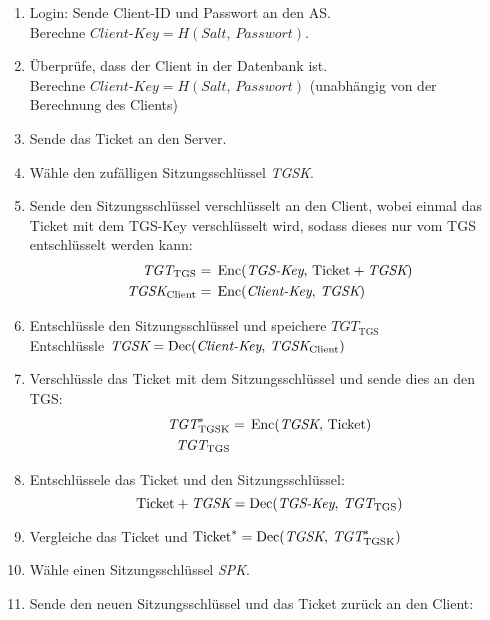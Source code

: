 				\begin{enumerate}
					\item Login: Sende Client-ID und Passwort an den AS. \\ Berechne \( \textit{Client-Key} = H(\textit{Salt},\, \textit{Passwort}) \).
					\item Überprüfe, dass der Client in der Datenbank ist. \\ Berechne \( \textit{Client-Key} = H(\textit{Salt},\, \textit{Passwort}) \) (unabhängig von der Berechnung des Clients)
					\item Sende das Ticket an den Server.
					\item Wähle den zufälligen Sitzungsschlüssel \textit{TGSK}.
					\item Sende den Sitzungsschlüssel verschlüsselt an den Client, wobei einmal das Ticket mit dem TGS-Key verschlüsselt wird, sodass dieses nur vom TGS entschlüsselt werden kann:
						\begin{align*}
							\textit{TGT}_\textrm{TGS}     & =\, \operatorname{Enc}(\textit{TGS-Key},\, \textrm{Ticket}+\textit{TGSK}) \\
							\textit{TGSK}_\textrm{Client} & =\, \operatorname{Enc}(\textit{Client-Key},\, \textit{TGSK})
						\end{align*}
					\item Entschlüssle den Sitzungsschlüssel und speichere \( \textit{TGT}_\textrm{TGS} \) \\ Entschlüssle \( \textit{TGSK} = \operatorname{Dec}(\textit{Client-Key},\, \textit{TGSK}_\textrm{Client}) \)
					\item Verschlüssle das Ticket mit dem Sitzungsschlüssel und sende dies an den TGS:
						\begin{align*}
							\textit{TGT}^*_\textrm{TGSK} & =\, \operatorname{Enc}(\textit{TGSK},\, \textrm{Ticket}) \\
							\textit{TGT}_\textrm{TGS}    &
						\end{align*}
					\item Entschlüssele das Ticket und den Sitzungsschlüssel:
						\begin{equation*}
							\textrm{Ticket}+\textit{TGSK} = \operatorname{Dec}(\textit{TGS-Key},\, \textit{TGT}_\textrm{TGS})
						\end{equation*}
					\item Vergleiche das Ticket und \( \textrm{Ticket}^* = \operatorname{Dec}(\textit{TGSK},\, \textit{TGT}^*_\textrm{TGSK}) \)
					\item Wähle einen Sitzungsschlüssel \textit{SPK}.
					\item Sende den neuen Sitzungsschlüssel und das Ticket zurück an den Client:

\end{enumerate}
